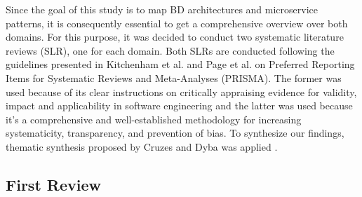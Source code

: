 \documentclass{bmcart}
\begin{document}
Since the goal of this study is to map BD architectures and microservice patterns, it is consequently essential to get a comprehensive overview over both domains. For this purpose, it was decided to conduct two systematic literature reviews (SLR), one for each domain. Both SLRs are conducted following the guidelines presented in Kitchenham et al. \cite{Kitchenham.2004} and Page et al. \cite{Page.2021} on Preferred Reporting Items for Systematic Reviews and Meta-Analyses (PRISMA). The former was used because of its clear instructions on critically appraising evidence for validity, impact and applicability in software engineering and the latter was used because it's a comprehensive and well-established methodology for increasing systematicity, transparency, and prevention of bias. To synthesize our findings, thematic synthesis proposed by Cruzes and Dyba was applied \cite{Cruzes.2011}. 








\subsection{First Review} \label{firstReview}
\end{document}
